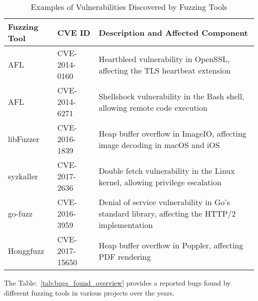 \begin{table}[h!]
\centering
\begin{tabularx}{\textwidth}{@{}>{\raggedright\arraybackslash}p{2cm}>{\raggedright\arraybackslash}p{3cm}X@{}}
\toprule
\textbf{Fuzzing Tool} & \textbf{CVE ID} & \textbf{Description and Affected Component} \\
\midrule
AFL & CVE-2014-0160 & Heartbleed vulnerability in OpenSSL, affecting the TLS heartbeat extension~\cite{durumeric2014matter} \\
\addlinespace
AFL & CVE-2014-6271 & Shellshock vulnerability in the Bash shell, allowing remote code execution~\cite{shetty2018shellshock} \\
\addlinespace
libFuzzer & CVE-2016-1839  & Heap buffer overflow in ImageIO, affecting image decoding in macOS and iOS \\
\addlinespace
syzkaller & CVE-2017-2636  & Double fetch vulnerability in the Linux kernel, allowing privilege escalation~\cite{wang2017double} \\
\addlinespace
go-fuzz & CVE-2016-3959  & Denial of service vulnerability in Go's standard library, affecting the HTTP/2 implementation \\
\addlinespace
Honggfuzz & CVE-2017-15650  & Heap buffer overflow in Poppler, affecting PDF rendering~\cite{haller2013dowsing} \\
\bottomrule
\end{tabularx}
\caption{Examples of Vulnerabilities Discovered by Fuzzing Tools}
\label{tab:vulnerabilities_examples}
\end{table}


The Table:~\ref{tab:bugs_found_overview} provides a reported bugs found by
different fuzzing tools in various projects over the years.

